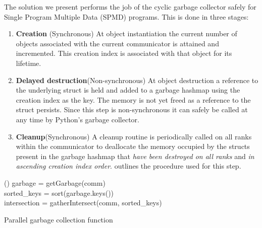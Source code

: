 \documentclass[a4paper,11pt]{article}
\begin{document}
The solution we present performs the job of the cyclic garbage collector safely for Single Program Multiple Data (SPMD) programs.
This is done in three stages:
\begin{enumerate}
	\item \label{item:create}\textbf{Creation} (Synchronous)
	At object instantiation the current number of objects associated with the current communicator is attained and incremented.
	This creation index is associated with that object for its lifetime.
	\item \label{item:destroy}\textbf{Delayed destruction}(Non-synchronous)
	At object destruction a reference to the underlying struct is held and added to a garbage hashmap using the creation index as the key.
	The memory is not yet freed as a reference to the struct persists.
	Since this step is non-synchronous it can safely be called at any time by Python's garbage collector.
	\item \label{item:cleanup}\textbf{Cleanup}(Synchronous)
	A cleanup routine is periodically called on all ranks within the communicator to deallocate the memory occupied by the structs present in the garbage hashmap that \emph{have been destroyed on all ranks} and \emph{in ascending creation index order}.
     outlines the procedure used for this step.
\end{enumerate}

\begin{algorithm}[htp]
	\Function(){
		garbage = getGarbage(comm)\\
		sorted\_keys = sort(garbage.keys())\\
		intersection = gatherIntersect(comm, sorted\_keys)\\
	}
	\caption[]{Parallel garbage collection function}
	\label{alg:cleanup}
\end{algorithm}
\end{document}
